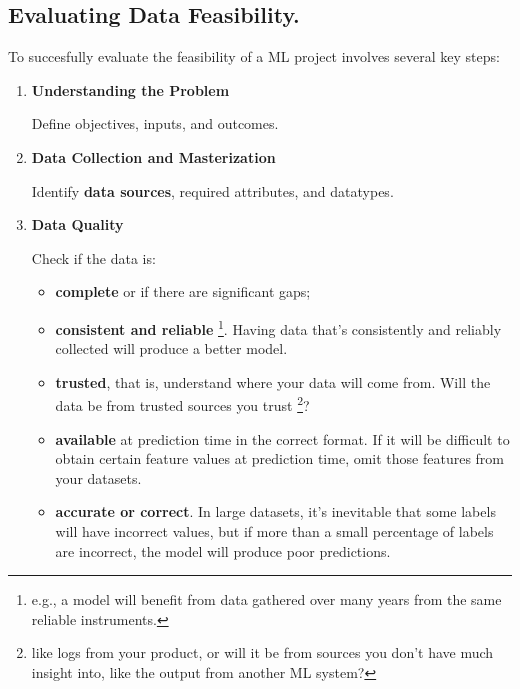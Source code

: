 \newpage
\subsection*{Evaluating Data Feasibility.}
To succesfully evaluate the feasibility of a ML project involves
several key steps:
\begin{enumerate}
    \item [1.] \textbf{Understanding the Problem}
    
    \noindent
    Define objectives, inputs, and outcomes.


    \item [2.] \textbf{Data Collection and Masterization}
    
    \noindent
    Identify \textbf{data sources}, required attributes, and datatypes.


    \item [3.] \textbf{Data Quality}
    
    \noindent
    Check if the data is:
    \begin{itemize}
        \item \textbf{complete} or if there are significant gaps; 
        
        \item \textbf{consistent and reliable}
        \footnote{
            e.g., a model will benefit from data gathered over
            many years from the same reliable instruments.
        }.
        Having data that's consistently and reliably collected will
        produce a better model. 
        
        \item \textbf{trusted}, that is, understand where your data
        will come from. Will the data be from trusted sources you trust
        \footnote{
            like logs from your product, or will it be from sources you
            don't have much insight into, like the output from another
            ML system?
        }?

        \item \textbf{available} at prediction time in the correct format.
        If it will be difficult to obtain certain feature values at
        prediction time, omit those features from your datasets.

        \item \textbf{accurate or correct}. In large datasets, it's
        inevitable that some labels will have incorrect values,
        but if more than a small percentage of labels are incorrect,
        the model will produce poor predictions.


\end{itemize}
\end{enumerate}
